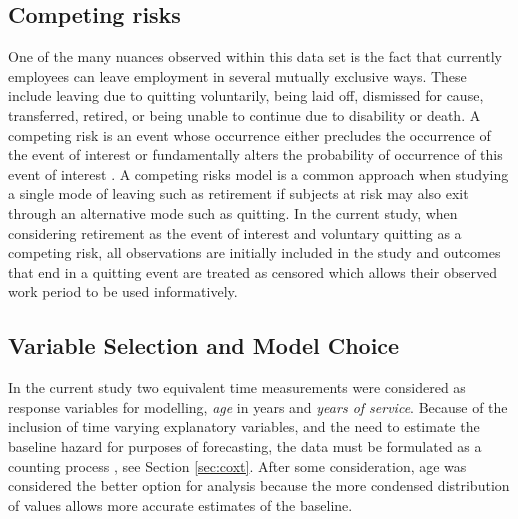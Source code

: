 \documentclass[12pt,letterpaper]{article}
\begin{document}

\subsection{Competing risks}
One of the many nuances observed within this data set is the fact that currently employees can leave employment in several mutually exclusive ways.  These include leaving due to quitting voluntarily, being laid off, dismissed for cause, transferred, retired, or being unable to continue due to disability or death. A competing risk is an event whose occurrence either precludes the occurrence of the event of interest or fundamentally alters the probability of occurrence of this event of interest \citep{tableman2003}.  A competing risks model is a common approach when studying a single mode of leaving such as retirement if subjects at risk may also exit through an alternative mode such as quitting.  In the current study, when considering retirement as the event of interest and voluntary quitting as a competing risk, all observations are initially included in the study and outcomes that end in a quitting event are treated as censored which allows their observed work period to be used informatively.


\subsection{Variable Selection and Model Choice}
In the current study two equivalent time measurements were considered as response variables for modelling, {\it age} in years and {\it years of service}.  Because of the inclusion of time varying explanatory variables, and the need to estimate the baseline hazard for purposes of forecasting, the data must be formulated as a counting process , see Section \ref{sec:coxt}.  After some consideration, age was considered the better option for analysis because the more condensed distribution of values allows more accurate estimates of the baseline.
\end{document}
